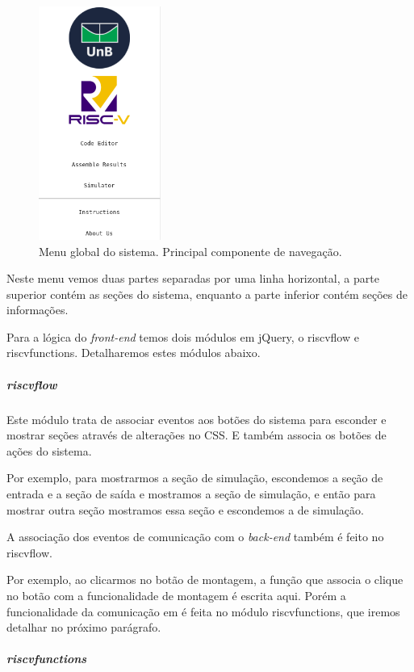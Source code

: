 			\begin{figure}[h!]
			  \centering
			  \includegraphics[width=4cm]{img/menu_global.png}
			  \caption{Menu global do sistema. Principal componente de navegação.}
			  \label{fig:menu_global}
			\end{figure}

			Neste menu vemos duas partes separadas por uma linha horizontal, a parte superior contém as seções do sistema, enquanto a parte inferior contém seções de informações.

			Para a lógica do \textit{front-end} temos dois módulos em jQuery, o riscv\textunderscore flow e riscv\textunderscore functions. Detalharemos estes módulos abaixo.

			\subparagraph{riscv\textunderscore flow}

				Este módulo trata de associar eventos aos botões do sistema para esconder e mostrar seções através de alterações no CSS. E também associa os botões de ações do sistema.

				Por exemplo, para mostrarmos a seção de simulação, escondemos a seção de entrada e a seção de saída e mostramos a seção de simulação, e então para mostrar outra seção mostramos essa seção e escondemos a de simulação.

				A associação dos eventos de comunicação com o \textit{back-end} também é feito no riscv\textunderscore flow.

				Por exemplo, ao clicarmos no botão de montagem, a função que associa o clique no botão com a funcionalidade de montagem é escrita aqui. Porém a funcionalidade da comunicação em é feita no módulo riscv\textunderscore functions, que iremos detalhar no próximo parágrafo.  

			\subparagraph{riscv\textunderscore functions}

